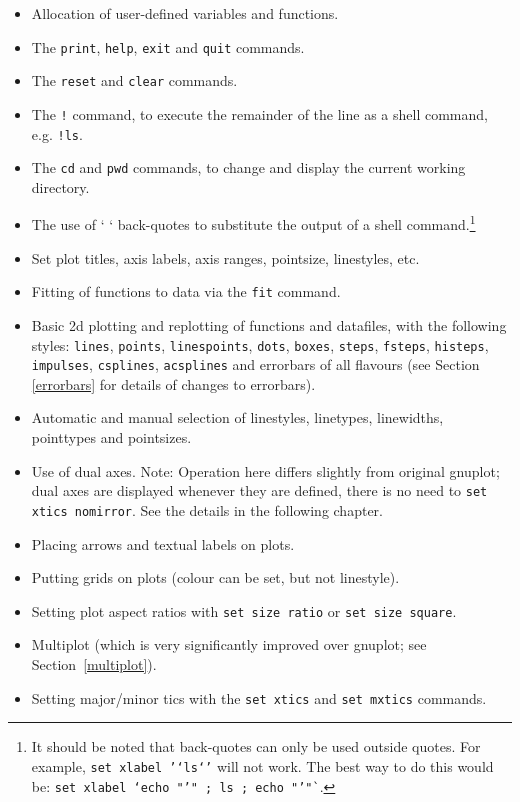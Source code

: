 \documentclass[a4paper,onecolumn,11pt]{book}
\begin{document}
\begin{itemize}
\item Allocation of user-defined variables and functions.
\item The \texttt{print}, \texttt{help}, \texttt{exit} and \texttt{quit} commands.
\item The \texttt{reset} and \texttt{clear} commands.
\item The \texttt{!} command, to execute the remainder of the line as a shell command, e.g. \texttt{!ls}.
\item The \texttt{cd} and \texttt{pwd} commands, to change and display the current working directory.
\item The use of ` ` back-quotes to substitute the output of a shell command.\footnote{It should be noted that back-quotes can only be used outside quotes. For example, \texttt{set xlabel '`ls`'} will not work. The best way to do this would be: \texttt{set xlabel `echo "'" ; ls ; echo "'"`}.}
\item Set plot titles, axis labels, axis ranges, pointsize, linestyles, etc.
\item Fitting of functions to data via the \texttt{fit} command.
\item Basic 2d plotting and replotting of functions and datafiles, with the following styles: \texttt{lines}, \texttt{points}, \texttt{linespoints}, \texttt{dots}, \texttt{boxes}, \texttt{steps}, \texttt{fsteps}, \texttt{histeps}, \texttt{impulses}, \texttt{csplines}, \texttt{acsplines} and errorbars of all flavours (see Section \ref{errorbars} for details of changes to errorbars).
\item Automatic and manual selection of linestyles, linetypes, linewidths, pointtypes and pointsizes.
\item Use of dual axes. Note: Operation here differs slightly from original gnuplot; dual axes are displayed whenever they are defined, there is no need to \texttt{set xtics nomirror}. See the details in the following chapter.
\item Placing arrows and textual labels on plots.
\item Putting grids on plots (colour can be set, but not linestyle).
\item Setting plot aspect ratios with \texttt{set size ratio} or \texttt{set size square}.
\item Multiplot (which is very significantly improved over gnuplot; see Section~\ref{multiplot}).
\item Setting major/minor tics with the \texttt{set xtics} and \texttt{set mxtics} commands.
\end{itemize}
\end{document}
